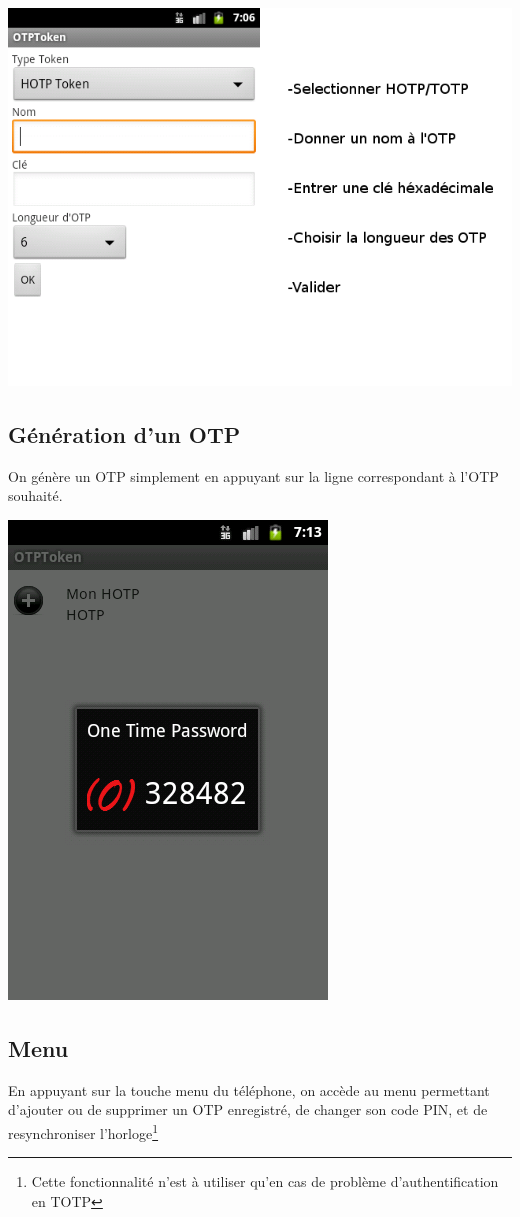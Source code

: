 \documentclass{../../../../res/univ-projet}
\begin{document}
\includegraphics[scale=0.5]{firstotp.png}

\subsection{Génération d'un OTP}
On génère un OTP simplement en appuyant sur la ligne correspondant à l'OTP souhaité.

\includegraphics[scale=0.5]{genotp.png}

\subsection{Menu}
En appuyant sur la touche menu du téléphone, on accède au menu permettant d'ajouter ou de supprimer un OTP enregistré, de changer son code PIN, et de resynchroniser l'horloge\footnote{Cette fonctionnalité n'est à utiliser qu'en cas de problème d'authentification en TOTP}
\end{document}
